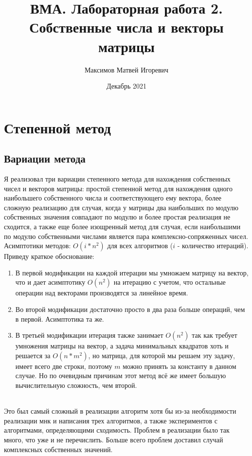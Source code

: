 \documentclass[a4paper,12pt,fleqn]{article}
\title{ВМА. Лабораторная работа 2.\\ Собственные числа и векторы матрицы}
\author{Максимов Матвей Игоревич}
\date{Декабрь 2021}
\begin{document}
\maketitle

\section{Степенной метод}
\subsection{Вариации метода}
Я реализовал три вариации степенного метода для нахождения собственных чисел и векторов матрицы: простой степенной метод для нахождения одного наибольшего собственного числа и соответствующего ему вектора, более сложную реализацию для случая, когда у матрицы два наибольших по модулю собственных значения совпадают по модулю и более простая реализация не сходится, а также еще более изощренный метод для случая, если наибольшими по модулю собственными числами является пара комплексно-сопряженных чисел. Асимптотики методов: $O(i * n^2)$ для всех алгоритмов ($i$ - количество итераций). Приведу краткое обоснование: \\
\begin{enumerate}
  \item В первой модификации на каждой итерации мы умножаем матрицу на вектор, что и дает асимптотику $O(n^2)$ на итерацию с учетом, что остальные операции над векторами производятся за линейное время.\\
  \item Во второй модификации достаточно просто в два раза больше операций, чем в первой. Асимптотика та же.\\
  \item В третьей модификации итерация также занимает $O(n^2)$ так как требует умножения матрицы на вектор, а задача минимальных квадратов хоть и решается за $O(n*m^2)$, но матрица, для которой мы решаем эту задачу, имеет всего две строки, поэтому $m$ можно принять за константу в данном случае. Но по очевидным причинам этот метод всё же имеет большую вычислительную сложность, чем второй.\\
\end{enumerate}\\
Это был самый сложный в реализации алгоритм хотя бы из-за необходимости реализации мнк и написания трех алгоритмов, а также экспериментов с алгоритмами, определяющими сходимость. Проблем в реализации было так много, что уже и не перечислить. Больше всего проблем доставил случай комплексных собственных значений.\\
\end{document}
